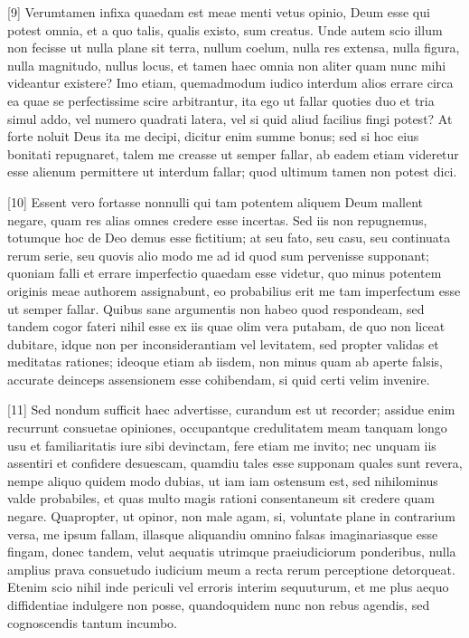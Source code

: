 [9] Verumtamen infixa quaedam est meae menti vetus opinio, Deum esse qui potest omnia, et a quo talis, qualis existo, sum creatus. Unde autem scio illum non fecisse ut nulla plane sit terra, nullum coelum, nulla res extensa, nulla figura, nulla magnitudo, nullus locus, et tamen haec omnia non aliter quam nunc mihi videantur existere? Imo etiam, quemadmodum iudico interdum alios errare circa ea quae se perfectissime scire arbitrantur, ita ego ut fallar quoties duo et tria simul addo, vel numero quadrati latera, vel si quid aliud facilius fingi potest? At forte noluit Deus ita me decipi, dicitur enim summe bonus; sed si hoc eius bonitati repugnaret, talem me creasse ut semper fallar, ab eadem etiam videretur esse alienum permittere ut interdum fallar; quod ultimum tamen non potest dici.

[10] Essent vero fortasse nonnulli qui tam potentem aliquem Deum mallent negare, quam res alias omnes credere esse incertas. Sed iis non repugnemus, totumque hoc de Deo demus esse fictitium; at seu fato, seu casu, seu continuata rerum serie, seu quovis alio modo me ad id quod sum pervenisse supponant; quoniam falli et errare imperfectio quaedam esse videtur, quo minus potentem originis meae authorem assignabunt, eo probabilius erit me tam imperfectum esse ut semper fallar. Quibus sane argumentis non habeo quod respondeam, sed tandem cogor fateri nihil esse ex iis quae olim vera putabam, de quo non liceat dubitare, idque non per inconsiderantiam vel levitatem, sed propter validas et meditatas rationes; ideoque etiam ab iisdem, non minus quam ab aperte falsis, accurate deinceps assensionem esse cohibendam, si quid certi velim invenire.

[11] Sed nondum sufficit haec advertisse, curandum est ut recorder; assidue enim recurrunt consuetae opiniones, occupantque credulitatem meam tanquam longo usu et familiaritatis iure sibi devinctam, fere etiam me invito; nec unquam iis assentiri et confidere desuescam, quamdiu tales esse supponam quales sunt revera, nempe aliquo quidem modo dubias, ut iam iam ostensum est, sed nihilominus valde probabiles, et quas multo magis rationi consentaneum sit credere quam negare. Quapropter, ut opinor, non male agam, si, voluntate plane in contrarium versa, me ipsum fallam, illasque aliquandiu omnino falsas imaginariasque esse fingam, donec tandem, velut aequatis utrimque praeiudiciorum ponderibus, nulla amplius prava consuetudo iudicium meum a recta rerum perceptione detorqueat. Etenim scio nihil inde periculi vel erroris interim sequuturum, et me plus aequo diffidentiae indulgere non posse, quandoquidem nunc non rebus agendis, sed cognoscendis tantum incumbo.

